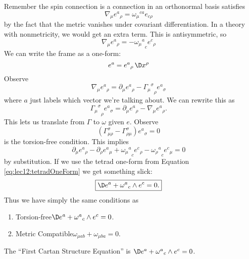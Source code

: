 Remember the spin connection is a connection in an orthonormal
basis satisfies
\begin{equation}%
\nabla_{\mu}{e^{a}}_{\rho}={\omega_{\mu}}^{ca}e_{c\rho}
\end{equation}
by the fact that the metric vanishes under covariant
differentiation. In a theory with nonmetricity, we would get an
extra term. This is antisymmetric, so
\begin{equation}
\nabla_{\mu}{e^{a}}_{\rho}=-{{\omega_{\mu}}^{a}}_{c}{e^{c}}_{\rho}
\end{equation}
We can write the frame as a one-form:
\begin{equation}\label{eq:lec12:tetradOneForm}
e^{a}={e^{a}}_{\rho}\,\D x^{\rho}
\end{equation}
Observe
\begin{equation}
\nabla_{\mu}{e^{a}}_{\rho}=\partial_{\mu}{e^{a}}_{\rho}
-{{\Gamma_{\mu}}^{\sigma}}_{\rho}{e^{a}}_{\sigma}
\end{equation}
where $a$ just labels which vector we're talking about. We can
rewrite this as
\begin{equation}
{{\Gamma_{\mu}}^{\sigma}}_{\rho}{e^{a}}_{\sigma}=\partial_{\mu}{e^{a}}_{\rho}
-\nabla_{\mu}{e^{a}}_{\rho}.
\end{equation}
This lets us translate from $\Gamma$ to $\omega$ given
$e$. Observe
\begin{equation}
(\Gamma^{\sigma}_{\mu\rho}-\Gamma^{\sigma}_{\rho\mu}){e^{a}}_{\sigma}=0
\end{equation}
is the torsion-free condition. This implies
\begin{equation}
\partial_{\mu}{e^{a}}_{\rho}-\partial_{\rho}{e^{a}}_{\mu}
+{{\omega_{\mu}}^{a}}_{c}{e^{c}}_{\rho}
-{{\omega_{\rho}}^{a}}_{c}{e^{c}}_{\mu}=0
\end{equation}
by substitution. If we use the tetrad one-form from Equation
\eqref{eq:lec12:tetradOneForm} we get something slick:
\begin{equation}
\boxed{
\D e^{a}+{\omega^{a}}_{c}\wedge e^{c}=0.
}
\end{equation}
Thus we have simply the same conditions as
\begin{enumerate}
\item Torsion-free\quad $\D e^{a}+{\omega^{a}}_{c}\wedge e^{c}=0$.
\item Metric Compatible\quad $\omega_{\mu ab}+\omega_{\mu ba}=0$.
\end{enumerate}
\begin{rmk}
The ``First Cartan Structure Equation'' is
\quad $\D e^{a}+{\omega^{a}}_{c}\wedge e^{c}=0$.
\end{rmk}
